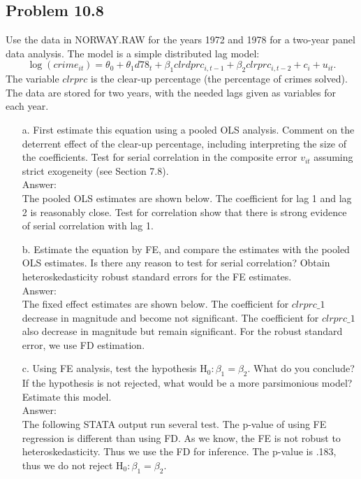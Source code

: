 \documentclass[10pt]{article}
\newcommand{\Hy}{\text{H}}
\begin{document}
\subsection*{Problem 10.8}
Use the data in NORWAY.RAW for the years 1972 and 1978 for a two-year panel data analysis. The model is a simple distributed lag model:
\[\log(crime_{it})=\theta_0+\theta_1d78_t+\beta_1clrdprc_{i,t-1}+\beta_2clrprc_{i,t-2}+c_i+u_{it}.\]
The variable $clrprc$ is the clear-up percentage (the percentage of crimes solved). The data are stored for two years, with the needed lags given as variables for each year. 
\begin{enumerate}
\item[a.] First estimate this equation using a pooled OLS analysis. Comment on the deterrent effect of the clear-up percentage, including interpreting the size of the coefficients. Test for serial correlation in the composite error $v_{it}$ assuming strict exogeneity (see Section 7.8). 
\\ Answer: \\
The pooled OLS estimates are shown below. The coefficient for lag 1 and lag 2 is reasonably close. Test for correlation show that there is strong evidence of serial correlation with lag 1.
\\ 

\item[b.] Estimate the equation by FE, and compare the estimates with the pooled OLS estimates. Is there any reason to test for serial correlation? Obtain heteroskedasticity robust standard errors for the FE estimates. 
\\ Answer: \\
The fixed effect estimates are shown below. The coefficient for $clrprc\_1$ decrease in magnitude and become not significant. The coefficient for $clrprc\_1$ also decrease in magnitude but remain significant. For the robust standard error, we use FD estimation.
\\ 

\item[c.] Using FE analysis, test the hypothesis $\Hy_0:\beta_1=\beta_2$. What do you conclude? If the hypothesis is not rejected, what would be a more parsimonious model? Estimate this model.
\\ Answer: \\
The following STATA output run several test. The p-value of using FE regression is different than using FD. As we know, the FE is not robust to heteroskedasticity. Thus we use the FD for inference. The p-value is .183, thus we do not reject $\Hy_0: \beta_1=\beta_2.$
\\ 
\end{enumerate}
\end{document}

